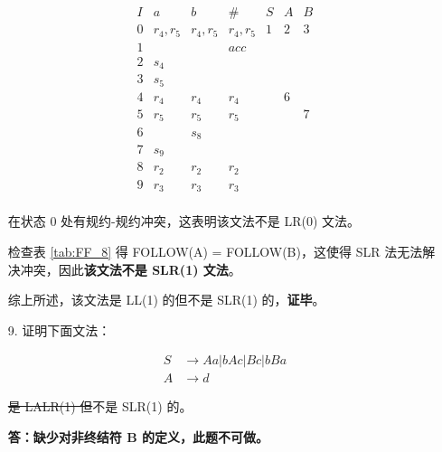 \begin{enumerate}
    \begin{equation*}
        \begin{array}{c|ccc|ccc}
            I & a & b & \# & S & A & B \\
            \hline
            0 & r_4, r_5 & r_4, r_5 & r_4, r_5 & 1 & 2 & 3 \\
            1 & & & acc & & & \\
            2 & s_4 & & & & & \\
            3 & s_5 & & & & & \\
            4 & r_4 & r_4 & r_4 & & 6 & \\
            5 & r_5 & r_5 & r_5 & & & 7 \\
            6 & & s_8 & & & & \\
            7 & s_9 & & & & & \\
            8 & r_2 & r_2 & r_2 & & & \\
            9 & r_3 & r_3 & r_3 & & & \\
        \end{array}
    \end{equation*}
    
    在状态 0 处有规约-规约冲突，这表明该文法不是 LR(0) 文法。
    
    检查表 \ref{tab:FF_8} 得 FOLLOW(A) = FOLLOW(B)，这使得 SLR 法无法解决冲突，因此\textbf{该文法不是 SLR(1) 文法}。
    
    综上所述，该文法是 LL(1) 的但不是 SLR(1) 的，\textbf{证毕}。
    
    \item[9.] 证明下面文法：
    
    \begin{align*}
        S & \to Aa | bAc | Bc | bBa \\
        A & \to d
    \end{align*}
    
    \sout{是 LALR(1) 但}不是 SLR(1) 的。
    
    \textbf{答：缺少对非终结符 B 的定义，此题不可做。}
    
    
    
    

\end{enumerate}
